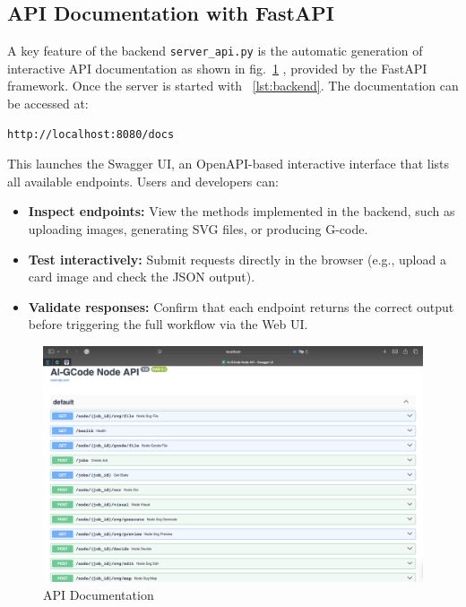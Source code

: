 \subsection{API Documentation with FastAPI}
A key feature of the backend \texttt{server\_api.py} is the automatic generation of interactive API documentation as shown in fig.~\ref{API} , provided by the FastAPI framework. Once the server is started with ~\ref{lst:backend}. The documentation can be accessed at:

\begin{lstlisting}[language=bash,caption={API Documentation}, label={lst:APID}]
	http://localhost:8080/docs
\end{lstlisting}

This launches the Swagger UI, an OpenAPI-based interactive interface that lists all available endpoints. Users and developers can:

\begin{itemize}
	\item \textbf{Inspect endpoints:} View the methods implemented in the backend, such as uploading images, generating SVG files, or producing G-code.
	\item \textbf{Test interactively:} Submit requests directly in the browser (e.g., upload a card image and check the JSON output).
	\item \textbf{Validate responses:} Confirm that each endpoint returns the correct output before triggering the full workflow via the Web UI.
\end{itemize}

\begin{figure}
	\begin{center}
		\includegraphics[width=1\linewidth]{Images/API.png}
		\caption{API Documentation}
		\label{API} 
	\end{center}
\end{figure}

